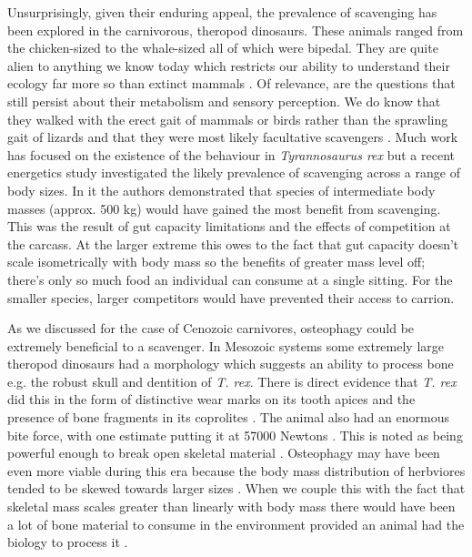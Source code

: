\documentclass[a4paper,12pt]{article}
\begin{document}
Unsurprisingly, given their enduring appeal, the prevalence of scavenging has been explored in the carnivorous, theropod dinosaurs. These animals ranged from the chicken-sized to the whale-sized all of which were bipedal. They are quite alien to anything we know today which restricts our ability to understand their ecology far more so than extinct mammals \citep{weishampel2004dinosauria}. Of relevance, are the questions that still persist about their metabolism \citep{grady2014evidence} and sensory perception. We do know that they walked with the erect gait of mammals or birds rather than the sprawling gait of lizards and that they were most likely facultative scavengers \citep{depalma2013physical}. Much work has focused on the existence of the behaviour in \textit{Tyrannosaurus rex} \citep{ruxton2003could,carbone2011intra} but a recent energetics study investigated the likely prevalence of scavenging across a range of body sizes. In it the authors demonstrated that species of intermediate body masses (approx. 500 kg) would have gained the most benefit from scavenging. This was the result of gut capacity limitations and the effects of competition at the carcass. At the larger extreme this owes to the fact that gut capacity doesn't scale isometrically with body mass so the benefits of greater mass level off; there's only so much food an individual can consume at a single sitting. For the smaller species, larger competitors would have prevented their access to carrion. 

As we discussed for the case of Cenozoic carnivores, osteophagy could be extremely beneficial to a scavenger. 
In Mesozoic systems some extremely large theropod dinosaurs had a morphology which suggests an ability to process bone e.g. the robust skull and dentition of \textit{T. rex}. There is direct evidence that \textit{T. rex} did this in the form of distinctive wear marks on its tooth apices \citep{farlow1994wear,schubert2005wear} and the presence of bone fragments in its coprolites \citep{chin1998king}. The animal also had an enormous bite force, with one estimate putting it at 57000 Newtons \citep{bates2012estimating}. This is noted as being powerful enough to break open skeletal material \citep{rayfield2001cranial}. Osteophagy may have been even more viable during this era because the body mass distribution of herbviores tended to be skewed towards larger sizes \citep{10.1371/journal.pone.0051925}. When we couple this with the fact that skeletal mass scales greater than linearly with body mass \citep{prange1979scaling} there would have been a lot of bone material to consume in the environment provided an animal had the biology to process it \citep{chure1997one}. 
\end{document}
